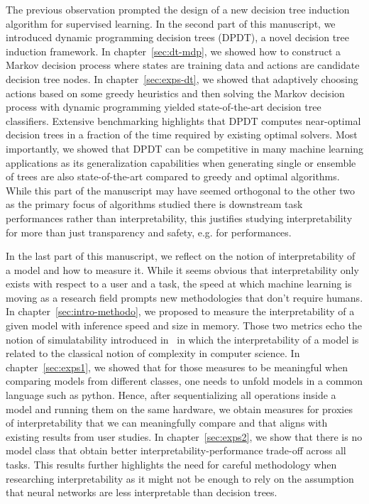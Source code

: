 The previous observation prompted the design of a new decision tree induction algorithm for supervised learning.
In the second part of this manuscript, we introduced dynamic programming decision trees (DPDT), a novel decision tree induction framework.
In chapter~\ref{sec:dt-mdp}, we showed how to construct a Markov decision process where states are training data and actions are candidate decision tree nodes.
In chapter~\ref{sec:exps-dt}, we showed that adaptively choosing actions based on some greedy heuristics and then solving the Markov decision process with dynamic programming yielded state-of-the-art decision tree classifiers.
Extensive benchmarking highlights that DPDT computes near-optimal decision trees in a fraction of the time required by existing optimal solvers.
Most importantly, we showed that DPDT can be competitive in many machine learning applications as its generalization capabilities when generating single or ensemble of trees are also state-of-the-art compared to greedy and optimal algorithms.
While this part of the manuscript may have seemed orthogonal to the other two as the primary focus of algorithms studied there is downstream task performances rather than interpretability, this justifies studying interpretability for more than just transparency and safety, e.g. for performances.

In the last part of this manuscript, we reflect on the notion of interpretability of a model and how to measure it.
While it seems obvious that interpretability only exists with respect to a user and a task, the speed at which machine learning is moving as a research field prompts new methodologies that don't require humans.
In chapter~\ref{sec:intro-methodo}, we proposed to measure the interpretability of a given model with inference speed and size in memory.
Those two metrics echo the notion of simulatability introduced in~\cite{lipton} in which the interpretability of a model is related to the classical notion of complexity in computer science.
In chapter~\ref{sec:exps1}, we showed that for those measures to be meaningful when comparing models from different classes, one needs to unfold models in a common language such as python.
Hence, after sequentializing all operations inside a model and running them on the same hardware, we obtain measures for proxies of interpretability that we can meaningfully compare and that aligns with existing results from user studies.
In chapter~\ref{sec:exps2}, we show that there is no model class that obtain better interpretability-performance trade-off across all tasks.
This results further highlights the need for careful methodology when researching interpretability as it might not be enough to rely on the assumption that neural networks are less interpretable than decision trees.

